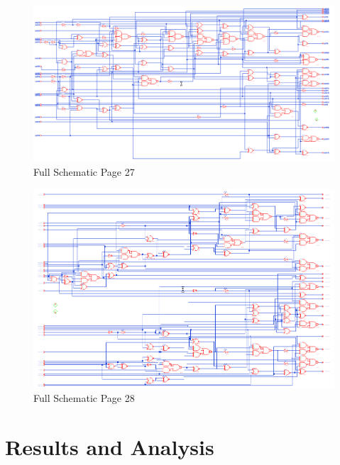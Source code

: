\documentclass[11pt]{article}
\begin{document}
		
		\begin{figure}[H] 
			\centering 
			\includegraphics[width=\textwidth,height=\dimexpr\textheight-4\baselineskip-\abovecaptionskip-\belowcaptionskip\relax,keepaspectratio]{"Pictures/Full Schematic Page 27"}
			\caption{Full Schematic Page 27} 
			\label{fig:Full-Schematic-Page-27} 
		\end{figure}
		
		
		\begin{figure}[H] 
			\centering 
			\includegraphics[width=\textwidth,height=\dimexpr\textheight-4\baselineskip-\abovecaptionskip-\belowcaptionskip\relax,keepaspectratio]{"Pictures/Full Schematic Page 28"}
			\caption{Full Schematic Page 28} 
			\label{fig:Full-Schematic-Page-28} 
		\end{figure}
		
		

		
		
		

\section{Results and Analysis}
		
\end{document}
